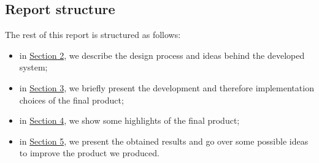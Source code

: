 \documentclass[../../main]{subfiles}
\begin{document}
\subsection{Report structure}
\label{ss:report-structure}

The rest of this report is structured as follows:
\begin{itemize}
    \item in \hyperref[s:design]{Section 2}, we describe the design process and ideas behind the developed system;
    \item in \hyperref[s:development]{Section 3}, we briefly present the development and therefore implementation choices of the final product;
    \item in \hyperref[s:app]{Section 4}, we show some highlights of the final product;
    \item in \hyperref[s:results]{Section 5}, we present the obtained results and go over some possible ideas to improve the product we produced.
\end{itemize}
\end{document}
